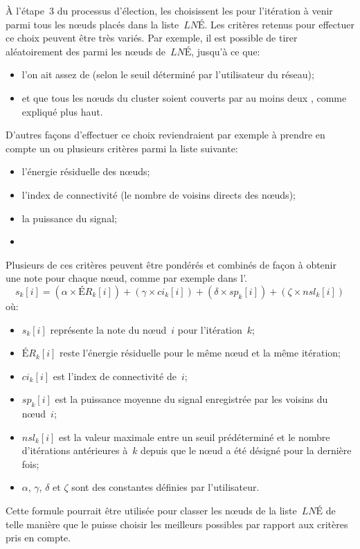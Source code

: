 À l'étape~3 du processus d'élection, les \chs choisissent les \cns pour l'itération à venir parmi tous les nœuds placés dans la liste~$\mathit{LNÉ}$.
Les critères retenus pour effectuer ce choix peuvent être très variés.
Par exemple, il est possible de tirer aléatoirement des \cns parmi les nœuds de~$\mathit{LNÉ}$, jusqu'à ce que:
\begin{itemize}
    \item l'on ait assez de \cns (selon le seuil déterminé par l'utilisateur du réseau);
    \item et que tous les nœuds du cluster soient couverts par au moins deux \cns, comme expliqué plus haut.
\end{itemize}
D'autres façons d'effectuer ce choix reviendraient par exemple à prendre en compte un ou plusieurs critères parmi la liste suivante:
\begin{itemize}
    \item l'énergie résiduelle des nœuds;
    \item l'index de connectivité (le nombre de voisins directs des nœuds);
    \item la puissance du signal;
    \item \etc
\end{itemize}
Plusieurs de ces critères peuvent être pondérés et combinés de façon à obtenir une note pour chaque nœud, comme par exemple dans l'.
\begin{equation}
    \label{se:eqn:score}
    s_k[i] = (\alpha \times \mathit{ÉR}_k[i]) + (\gamma \times ci_k[i]) + (\delta \times sp_k[i]) + (\zeta \times nsl_k[i])
\end{equation}
où:
\begin{itemize}
    \item $s_k[i]$ représente la note du nœud~$i$ pour l'itération~$k$;
    \item $\mathit{ÉR}_k[i]$ reste l'énergie résiduelle pour le même nœud et la même itération;
    \item $ci_k[i]$ est l'index de connectivité de~$i$;
    \item $sp_k[i]$ est la puissance moyenne du signal enregistrée par les voisins du nœud~$i$;
    \item $nsl_k[i]$ est la valeur maximale entre un seuil prédéterminé et le nombre d'itérations antérieures à~$k$ depuis que le nœud a été désigné \cn pour la dernière fois;
    \item $\alpha$, $\gamma$, $\delta$ et $\zeta$ sont des constantes définies par l'utilisateur.
\end{itemize}
Cette formule pourrait être utilisée pour classer les nœuds de la liste~$\mathit{LNÉ}$ de telle manière que le \ch puisse choisir les meilleurs \cns possibles par rapport aux critères pris en compte.

